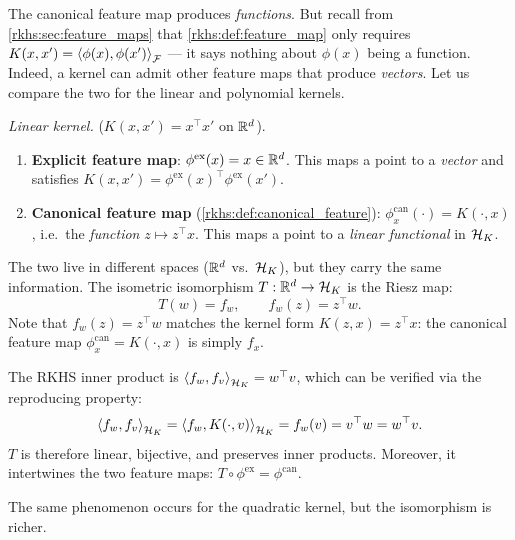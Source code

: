 \begin{notechapter}
\begin{intuition}
The canonical feature map produces \emph{functions}.
But recall from \cref{rkhs:sec:feature_maps} that
\cref{rkhs:def:feature_map} only requires
$K(x,x') = \left\langle \phi(x), \phi(x') \right\rangle_{\mathcal{F}}$
--- it says nothing about $\phi(x)$ being a function.
Indeed, a kernel can admit other feature maps that
produce \emph{vectors}. Let us compare the two for
the linear and polynomial kernels.

\medskip
\emph{Linear kernel.}
($K(x,x') = x^\top x'$ on $\mathbb{R}^d$).
\begin{enumerate}
  \item \textbf{Explicit feature map}:
    $\phi^{\mathrm{ex}}(x) = x \in \mathbb{R}^d$.
    This maps a point to a \emph{vector} and satisfies
    $K(x,x') = \phi^{\mathrm{ex}}(x)^\top
    \phi^{\mathrm{ex}}(x')$.
  \item \textbf{Canonical feature map}
    (\cref{rkhs:def:canonical_feature}):
    $\phi_x^{\mathrm{can}}(\cdot) = K(\cdot,x)$,
    i.e.\ the \emph{function}
    $z \mapsto z^\top x$.
    This maps a point to a \emph{linear functional}
    in $\mathcal{H}_K$.
\end{enumerate}
The two live in different spaces ($\mathbb{R}^d$ vs.\
$\mathcal{H}_K$), but they carry the same information. The
isometric isomorphism $T: \mathbb{R}^d \to \mathcal{H}_K$ is the
Riesz map:
\[
T(w) = f_w, \qquad f_w(z) = z^\top w.
\]
Note that $f_w(z) = z^\top w$ matches the kernel form
$K(z,x) = z^\top x$: the canonical feature map
$\phi_x^{\mathrm{can}} = K(\cdot, x)$ is simply
$f_x$.

The RKHS inner product is
$\left\langle f_w, f_v \right\rangle_{\mathcal{H}_K} = w^\top v$, which can be
verified via the reproducing property:
\[
\left\langle f_w, f_v \right\rangle_{\mathcal{H}_K}
= \left\langle f_w, K(\cdot, v) \right\rangle_{\mathcal{H}_K}
= f_w(v) = v^\top w = w^\top v.
\]
$T$ is therefore linear, bijective, and preserves
inner products. Moreover, it intertwines the two
feature maps:
$T \circ \phi^{\mathrm{ex}} = \phi^{\mathrm{can}}$.
\end{intuition}

\begin{intuition}
The same phenomenon occurs for the quadratic kernel,
but the isomorphism is richer.


\end{intuition}
\end{notechapter}

